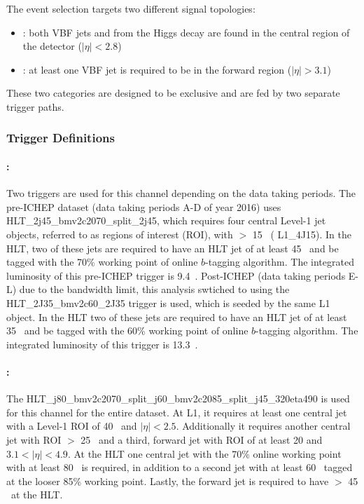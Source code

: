 \label{sec:vbf-evtsel}

The event selection targets two different signal topologies:
\begin{itemize}
\item \fourcentral: both VBF jets and \bjets from the Higgs decay are 
  found in the central region of the detector ($|\eta|<2.8$)
\item \twocentral: at least one VBF jet is required to be
  in the forward region ($|\eta|>3.1$)
\end{itemize}

These two categories are designed to be exclusive and are fed by two separate trigger paths.  

\subsubsection{Trigger Definitions}

\paragraph{\fourcentral:} Two triggers are used for this channel depending on the data taking periods. The pre-ICHEP dataset (data taking periods A-D of year 2016) uses HLT\_2j45\_bmv2c2070\_split\_2j45, which requires four central Level-1 jet objects, referred to as regions of interest (ROI),  with \ET $>$ 15 \GeV~( L1\_4J15).  In the HLT, two of these jets are required to have an HLT jet \ET of at least 45 \GeV~and be tagged with the 70\% working point of online $b$-tagging algorithm. The integrated luminosity of this pre-ICHEP trigger is 9.4~\ifb. Post-ICHEP (data taking periods E-L) due to the bandwidth limit, this analysis swtiched to using the HLT\_2J35\_bmv2c60\_2J35 trigger is used, which is seeded by the same L1 object.  In the HLT two of these jets are required to have an HLT jet \ET of at least 35 \GeV~and be tagged with the 60\% working point of online $b$-tagging algorithm. The integrated luminosity of this trigger is 13.3~\ifb.

\paragraph{\twocentral:} The HLT\_j80\_bmv2c2070\_split\_j60\_bmv2c2085\_split\_j45\_320eta490 is used for this channel for the entire dataset.  At L1, it requires at least one central jet with a Level-1 ROI \ET of 40 \GeV~and $|\eta| < 2.5$.  Additionally it requires another central jet with ROI \ET $>$ 25 \GeV~and a third, forward jet with ROI \ET of at least 20 and  $3.1 < |\eta| < 4.9$.   At the HLT one central jet \btagged  with the 70\% online working point with at least 80 \GeV~is required, in addition to a second jet with at least 60 \GeV~tagged at the looser 85\% working point. Lastly, the forward jet is required to have \ET $>$ 45 \GeV~at the HLT.


